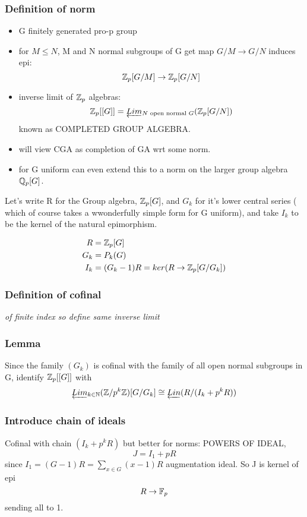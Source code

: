 \subsubsection*{Definition of norm}
\begin{itemize}
\item G finitely generated pro-p group
\item for $M\leq N$, M and N normal subgroups of G get map $G / M\rightarrow G/N$ induces epi:
$$\mathbb Z_p[G/M]\rightarrow \mathbb Z_p [G/N]$$
\item inverse limit of $\mathbb Z_p$ algebras:
$$\mathbb Z_p[[G]]=\underleftarrow{Lim}_{N\text{ open normal } G}(\mathbb Z_p [G/N])$$
known as COMPLETED GROUP ALGEBRA.
\item will view CGA as completion of GA wrt some norm.
\item for G uniform can even extend this to a norm on the larger group algebra $\mathbb Q_p[G]$.
\end{itemize}

Let's write R for the Group algebra, $\mathbb Z_p [G]$, and $G_k$ for it's lower central series ( which of course takes a wwonderfully simple form for G uniform), and take $I_k$ to be the kernel of the natural epimorphism.

\begin{eqnarray}
\nonumber R &=\mathbb Z_p [G]\\
\nonumber G_k &= P_k(G)\\
\nonumber I_k &= (G_k - 1)R = ker(R\rightarrow \mathbb Z_p[G/G_k])
\end{eqnarray}

\subsubsection*{Definition of cofinal}
\emph{of finite index so define same inverse limit}




\subsubsection*{Lemma}
Since the family $(G_k)$ is cofinal with the family of all open normal subgroups in G, identify $\mathbb Z_p[[G]]$ with
$$\underleftarrow{Lim}_{k\in\mathbb N}(\mathbb Z / p^k\mathbb Z)[G / G_k] \cong \underleftarrow{Lin} (R/ (I_k + p^k R))$$

\subsubsection*{Introduce chain of ideals}
Cofinal with chain $(I_k+p^kR)$ but better for norms: POWERS OF IDEAL,
$$J = I_1+pR$$
since $I_1 = (G-1)R = \sum_{x\in G} (x-1)R$ augmentation ideal. So J is kernel of epi $$R\rightarrow \mathbb F_p$$ sending all to 1.

